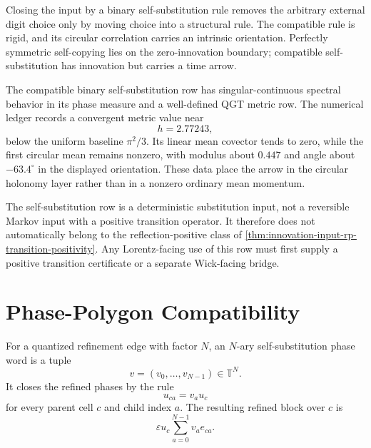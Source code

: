 \begin{principle}
\label{prin:innovation-input-self-reference-cost}
Closing the input by a binary self-substitution rule removes the arbitrary
external digit choice only by moving choice into a structural rule. The
compatible rule is rigid, and its circular correlation carries an intrinsic
orientation. Perfectly symmetric self-copying lies on the zero-innovation
boundary; compatible self-substitution has innovation but carries a time
arrow.
\end{principle}

\begin{principle}
\label{prin:innovation-input-self-substitution-spectral-metric-rows}
The compatible binary self-substitution row has singular-continuous
spectral behavior in its phase measure and a well-defined QGT metric row.
The numerical ledger records a convergent metric value near
$$
h=2.77243,
$$
below the uniform baseline $\pi^2/3$. Its linear mean covector tends to
zero, while the first circular mean remains nonzero, with modulus about
$0.447$ and angle about $-63.4^\circ$ in the displayed orientation. These
data place the arrow in the circular holonomy layer rather than in a
nonzero ordinary mean momentum.
\end{principle}

\begin{principle}
\label{prin:innovation-input-self-substitution-rp-boundary}
The self-substitution row is a deterministic substitution input, not a
reversible Markov input with a positive transition operator. It therefore
does not automatically belong to the reflection-positive class of
\autoref{thm:innovation-input-rp-transition-positivity}. Any Lorentz-facing
use of this row must first supply a positive transition certificate or a
separate Wick-facing bridge.
\end{principle}

\section{Phase-Polygon Compatibility}
\label{sec:innovation-input-phase-polygon-compatibility}

\begin{definition}
\label{def:innovation-input-self-substitution-phase-word}
For a quantized refinement edge with factor $N$, an $N$-ary
self-substitution phase word is a tuple
$$
v=(v_0,\ldots,v_{N-1})\in\mathbb T^N.
$$
It closes the refined phases by the rule
$$
u_{ca}=v_a u_c
$$
for every parent cell $c$ and child index $a$. The resulting refined block
over $c$ is
$$
\varepsilon u_c\sum_{a=0}^{N-1}v_a e_{ca}.
$$
\end{definition}


